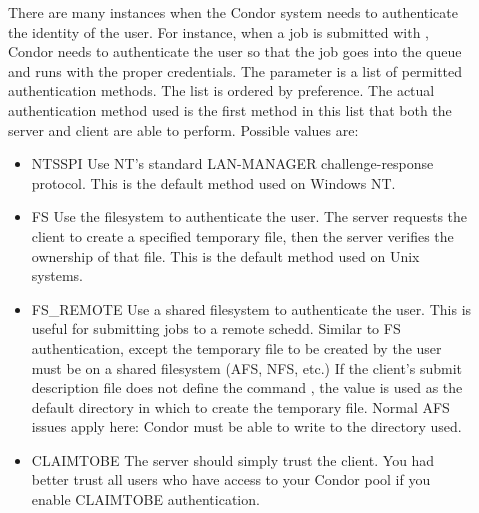 \begin{description}
\item[]\label{param:AuthenticationMethods}
  There are many instances when the Condor system needs to authenticate
  the identity of the user.  For instance, when a job is submitted with
  , Condor needs to authenticate the user so that the job
  goes into the queue and runs with the proper credentials.  The
   parameter is a list of
  permitted authentication methods.  The list is ordered by
  preference.  The actual authentication method used is the first method
  in this list that both the server and client are able to perform.
  Possible values are:
  \begin{itemize}
	\item NTSSPI Use NT's standard LAN-MANAGER challenge-response protocol.
	\Note This is the default method used on Windows NT.
	\item FS Use the filesystem to authenticate the user.  
		The server requests the client to create a specified temporary
		file, then the server verifies the ownership of that file. \Note
		This is the default method used on Unix systems.
	\item FS\_REMOTE Use a shared filesystem to authenticate the user.
		This is useful for submitting jobs to a remote schedd.
		Similar to FS authentication, except the temporary file to be
		created by the user must be on a shared filesystem (AFS, NFS, etc.)
		If the client's submit description file does not define the 
		command , the  value is used 
		as the default directory in which to create the temporary file.
		\Note Normal AFS issues apply here: Condor must be able to write
		to the directory used.
	\item CLAIMTOBE The server should simply trust the client.  
		\Note You had better trust all users who have access to your Condor
		pool if you enable CLAIMTOBE authentication.
  \end{itemize}


\end{description}
